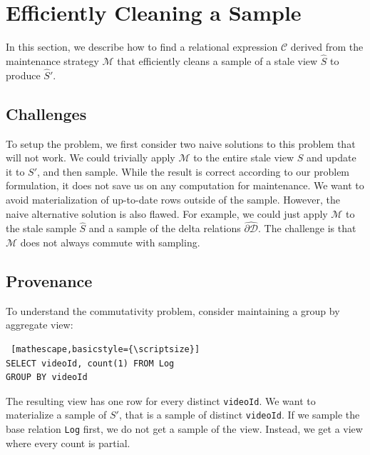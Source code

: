 \section{Efficiently Cleaning a Sample} \label{sampling}
In this section, we describe how to find a relational expression $\mathcal{C}$ derived from the maintenance strategy $\mathcal{M}$ that
efficiently cleans a sample of a stale view $\widehat{S}$ to produce $\widehat{S}'$.

\subsection{Challenges}
To setup the problem, we first consider two naive solutions to this problem that will not work. 
We could trivially apply $\mathcal{M}$ to the entire stale view $S$ and update it to $S'$, and then sample.
While the result is correct according to our problem formulation, it does not save us on any computation for maintenance.
We want to avoid materialization of up-to-date rows outside of the sample. 
However, the naive alternative solution is also flawed. 
For example, we could just apply $\mathcal{M}$ to the stale sample $\widehat{S}$ and a sample of the delta relations $\widehat{\partial \mathcal{D}}$. 
The challenge is that $\mathcal{M}$ does not always commute with sampling. 

\subsection{Provenance}
\label{lin}
To understand the commutativity problem, consider maintaining a group by aggregate view:
\begin{lstlisting} [mathescape,basicstyle={\scriptsize}]
SELECT videoId, count(1) FROM Log
GROUP BY videoId
\end{lstlisting}
The resulting view has one row for every distinct \texttt{videoId}.
We want to materialize a sample of $S'$, that is a sample of distinct \texttt{videoId}.
If we sample the base relation \texttt{Log} first, we do not get a sample of the view.
Instead, we get a view where every count is partial.

